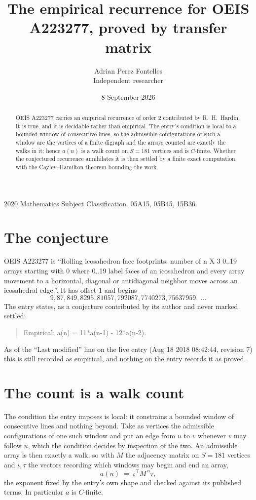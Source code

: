 \documentclass[11pt,a4paper]{article}
\title{The empirical recurrence for OEIS A223277, proved by transfer matrix}
\author{Adrian Perez Fontelles\\ \small Independent researcher}
\date{8 September 2026}
\theoremstyle{plain}
\theoremstyle{definition}
\begin{document}
\maketitle

\begin{abstract}
OEIS A223277 carries an empirical recurrence of order $2$ contributed by R.~H.~Hardin. It is
true, and it is decidable rather than empirical. The entry's condition is local to a bounded window of consecutive lines, so
the admissible configurations of such a window are the vertices of a finite digraph and the
arrays counted are exactly the walks in it; hence $a(n)$ is a walk count on $S=181$ vertices
and is $C$-finite. Whether the conjectured recurrence annihilates it is then settled by a
finite exact computation, with the Cayley--Hamilton theorem bounding the work.
\end{abstract}

\noindent\small 2020 Mathematics Subject Classification. 05A15, 05B45, 15B36.\normalsize

\section{The conjecture}

OEIS A223277 is ``Rolling icosahedron face footprints: number of n X 3 0..19 arrays starting with 0 where 0..19 label faces of an icosahedron and every array movement to a horizontal, diagonal or antidiagonal neighbor moves across an icosahedral edge.''. It has offset $1$ and begins
\[
9, 87, 849, 8295, 81057, 792087, 7740273, 75637959,\ \dots
\]
The entry states, as a conjecture contributed by its author and never marked settled:
\begin{quote}
Empirical: a(n) = 11*a(n-1) - 12*a(n-2).
\end{quote}
As of the ``Last modified'' line on the live entry (Aug 18 2018 08:42:44, revision 7) this is still
recorded as empirical, and nothing on the entry records it as proved.

\section{The count is a walk count}

The condition the entry imposes is local: it constrains a bounded window of consecutive lines and nothing beyond. Take as
vertices the admissible configurations of one such window and put an edge from $u$ to $v$
whenever $v$ may follow $u$, which the condition decides by inspection of the two. An
admissible array is then exactly a walk, so with $M$ the adjacency matrix on $S=181$ vertices
and $\iota,\tau$ the vectors recording which windows may begin and end an array,
\[
a(n)\;=\;\iota^{\!\top}M^{\,n}\tau ,
\]
the exponent fixed by the entry's own shape and checked against its published terms. In
particular $a$ is $C$-finite.
\end{document}
